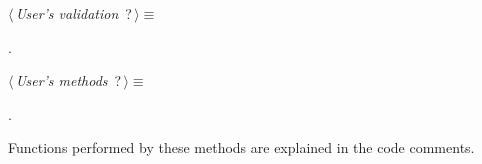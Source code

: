 	\begin{flushleft} \small
\begin{minipage}{\linewidth}\label{scrap18}\raggedright\small
{} $\langle\,${\itshape {User's validation}}\nobreak\ {\footnotesize {?}}$\,\rangle\equiv$
\vspace{-1ex}
\begin{list}{}{} \item

                
        {\NWsep}
\end{list}
\vspace{-1.5ex}
\footnotesize
\begin{list}{}{\setlength{\itemsep}{-\parsep}\setlength{\itemindent}{-\leftmargin}}
\item {\NWtxtMacroNoRef}.

\item{}
\end{list}
\end{minipage}\vspace{4ex}
\end{flushleft}
\begin{flushleft} \small
\begin{minipage}{\linewidth}\label{scrap19}\raggedright\small
{} $\langle\,${\itshape {User's methods}}\nobreak\ {\footnotesize {?}}$\,\rangle\equiv$
\vspace{-1ex}
\begin{list}{}{} \item

                
        {\NWsep}
\end{list}
\vspace{-1.5ex}
\footnotesize
\begin{list}{}{\setlength{\itemsep}{-\parsep}\setlength{\itemindent}{-\leftmargin}}
\item {\NWtxtMacroNoRef}.

\item{}
\end{list}
\end{minipage}\vspace{4ex}
\end{flushleft}
Functions performed by these methods are explained in the code comments.